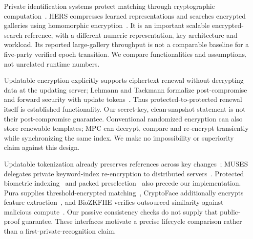 \documentclass[journal]{IEEEtran}
\begin{document}
Private identification systems protect matching through cryptographic computation~\cite{franz2009privacyface,osadchy2010scifi}. HERS compresses learned representations and searches encrypted galleries using homomorphic encryption~\cite{engelsma2022hers}. It is an important scalable encrypted-search reference, with a different numeric representation, key architecture and workload. Its reported large-gallery throughput is not a comparable baseline for a five-party verified epoch transition. We compare functionalities and assumptions, not unrelated runtime numbers.

Updatable encryption explicitly supports ciphertext renewal without decrypting data at the updating server; Lehmann and Tackmann formalize post-compromise and forward security with update tokens~\cite{lehmann2018updatable}. Thus protected-to-protected renewal itself is established functionality. Our secret-key, clean-snapshot statement is not their post-compromise guarantee. Conventional randomized encryption can also store renewable templates; MPC can decrypt, compare and re-encrypt transiently while synchronizing the same index. We make no impossibility or superiority claim against this design.

Updatable tokenization already preserves references across key changes~\cite{cachin2017tokenization}; MUSES delegates private keyword-index re-encryption to distributed servers~\cite{le2024muses}. Protected biometric indexing~\cite{drozdowski2021fusion} and packed preselection~\cite{xin2026pfip} also precede our implementation. Pura supplies threshold-encrypted matching~\cite{xu2025pura}, CryptoFace additionally encrypts feature extraction~\cite{ao2025cryptoface}, and BioZKFHE verifies outsourced similarity against malicious compute~\cite{xin2026biozkfhe}. Our passive consistency checks do not supply that public-proof guarantee. These interfaces motivate a precise lifecycle comparison rather than a first-private-recognition claim.
\end{document}
